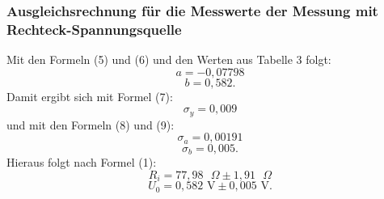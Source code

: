 \subsubsection{Ausgleichsrechnung für die Messwerte der Messung mit Rechteck-Spannungsquelle}
Mit den Formeln (5) und (6) und den Werten aus Tabelle 3 folgt:
\begin{displaymath}
a=-0,07798
\end{displaymath}
\begin{displaymath}
b=0,582\text{.}
\end{displaymath}
Damit ergibt sich mit Formel (7):
\begin{displaymath}
\sigma_y=0,009
\end{displaymath}
und mit den Formeln (8) und (9):
\begin{displaymath}
\sigma_a=0,00191
\end{displaymath}
\begin{displaymath}
\sigma_b=0,005\text{.}
\end{displaymath}
Hieraus folgt nach Formel (1):
\begin{displaymath}
R_i=77,98\text{ }\Omega\pm 1,91\text{ }\Omega
\end{displaymath}
\begin{displaymath}
U_0=0,582\text{ V}\pm 0,005\text{ V.}
\end{displaymath}

